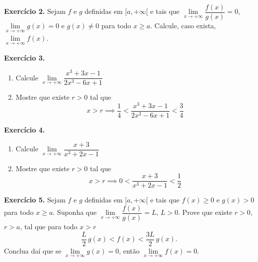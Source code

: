 \documentclass[12pt,a4paper]{article}
\begin{document}
\vspace{0.5cm}
\noindent\textbf{Exercício 2.}
Sejam $f$ e $g$ definidas em $[a, +\infty[$ e tais que $\lim\limits_{x \to +\infty} \dfrac{f(x)}{g(x)} = 0$, $\lim\limits_{x \to +\infty} g(x) = 0$ e $g(x) \neq 0$ para todo $x \ge a$. Calcule, caso exista, $\lim\limits_{x \to +\infty} f(x)$.

\vspace{0.5cm}
\noindent\textbf{Exercício 3.}
\begin{enumerate}
    \renewcommand{\theenumi}{\alph{enumi}}
    \renewcommand{\labelenumi}{\theenumi)}
    \item Calcule $\lim\limits_{x \to +\infty} \dfrac{x^3 + 3x - 1}{2x^3 - 6x + 1}$
    \item Mostre que existe $r > 0$ tal que
    \[
    x > r \implies \dfrac{1}{4} < \dfrac{x^3 + 3x - 1}{2x^3 - 6x + 1} < \dfrac{3}{4}
    \]
\end{enumerate}

\vspace{0.5cm}
\noindent\textbf{Exercício 4.}
\begin{enumerate}
    \renewcommand{\theenumi}{\alph{enumi}}
    \renewcommand{\labelenumi}{\theenumi)}
    \item Calcule $\lim\limits_{x \to +\infty} \dfrac{x + 3}{x^3 + 2x - 1}$
    \item Mostre que existe $r > 0$ tal que
    \[
    x > r \implies 0 < \dfrac{x + 3}{x^3 + 2x - 1} < \dfrac{1}{2}
    \]
\end{enumerate}

\vspace{0.5cm}
\noindent\textbf{Exercício 5.}
Sejam $f$ e $g$ definidas em $[a, +\infty[$ e tais que $f(x) \ge 0$ e $g(x) > 0$ para todo $x \ge a$. Suponha que $\lim\limits_{x \to +\infty} \dfrac{f(x)}{g(x)} = L$, $L > 0$. Prove que existe $r > 0$, $r > a$, tal que para todo $x > r$
\[
\dfrac{L}{2}\,g(x) < f(x) < \dfrac{3L}{2}\,g(x).
\]
Conclua daí que se $\lim\limits_{x \to +\infty} g(x) = 0$, então $\lim\limits_{x \to +\infty} f(x) = 0$.
\end{document}
